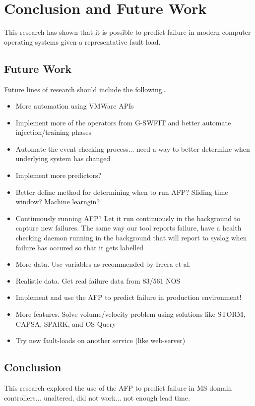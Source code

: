 \chapter{Conclusion and Future Work} \label{chapter5}
This research has shown that it is possible to predict failure in modern
computer operating systems given a representative fault load.

\section{Future Work}
Future lines of research should include the following\dots

\begin{itemize}
\item{More automation using VMWare APIs}
\item{Implement more of the operators from G-SWFIT and better automate
injection/training phases}
\item{Automate the event checking process... need a way to better determine
when underlying system has changed}
\item{Implement more predictors?}
\item{Better define method for determining when to run AFP? Sliding time
window?  Machine learngin?}
\item{Continuously running AFP?  Let it run continuously in the background to
capture new failures.  The same way our tool reports failure, have a health
checking daemon running in the background that will report to syslog when
failure has occured so that it gets labelled}
\item{More data.  Use variables as recommended by Irrera et al.}
\item{Realistic data.  Get real failure data from 83/561 NOS}
\item{Implement and use the AFP to predict failure in production environment!}
\item{More features.  Solve volume/velocity problem using solutions like STORM,
CAPSA, SPARK, and OS Query}
\item{Try new fault-loads on another service (like web-server)}
\end{itemize}

\section{Conclusion}
This research explored the use of the AFP to predict failure in MS domain
controllers... unaltered, did not work... not enough lead time.

